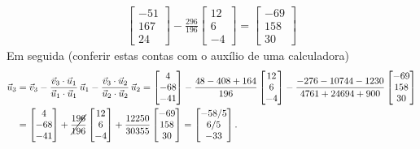 \begin{ex}
\begin{align*}
\begin{bmatrix}
 -51  \\
 167  \\
 24
\end{bmatrix} - \frac{296}{196}
\begin{bmatrix}
12 \\
6 \\
-4
\end{bmatrix} =
\begin{bmatrix}
 -69  \\
 158  \\
 30
\end{bmatrix}
  \end{align*}
 Em seguida (conferir estas contas com o auxílio de uma calculadora)
  \begin{align*}
\vec{u}_3 & = \vec{v}_3 - \frac{\vec{v}_3 \cdot \vec{u}_1}{\vec{u}_1 \cdot \vec{u}_1} \, \vec{u}_1 - \frac{\vec{v}_3 \cdot \vec{u}_2}{\vec{u}_2 \cdot \vec{u}_2} \, \vec{u}_2 = \begin{bmatrix}
  4 \\
 -68 \\
 -41
\end{bmatrix} - \frac{48-408 + 164}{196}
\begin{bmatrix}
12 \\
6 \\
-4
\end{bmatrix} - \frac{-276 - 10744 - 1230}{4761 + 24694 + 900}
\begin{bmatrix}
 -69  \\
 158  \\
 30
\end{bmatrix} \\
   & = \begin{bmatrix}
  4 \\
 -68 \\
 -41
\end{bmatrix} + \cancel{\frac{196}{196}}
\begin{bmatrix}
12 \\
6 \\
-4
\end{bmatrix} + \frac{12250}{30355}
\begin{bmatrix}
 -69  \\
 158  \\
 30
\end{bmatrix} = \begin{bmatrix}
 -58/5  \\
 6/5  \\
 -33
\end{bmatrix}.
  \end{align*}

\end{ex}

